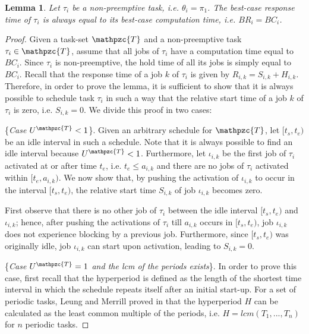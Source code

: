 \documentclass[conference,compsoc]{IEEEtran}
\newtheorem{lemma}{Lemma}
\begin{document}
\begin{lemma}
	\textit{Let $\tau_i$ be a non-preemptive task, i.e. $\theta_i = \pi_1$. The \textit{best-case response time} of $\tau_i$ is always equal to its \textit{best-case computation time}, i.e. $BR_i = BC_i$.}
\end{lemma}

\begin{proof}
	Given a task-set $\mathpzc{T}$ and a non-preemptive task $\tau_i \in \mathpzc{T}$, assume that all jobs of $\tau_i$ have a computation time equal to $BC_i$. Since $\tau_i$ is non-preemptive, the hold time of all its jobs is simply equal to $BC_i$. Recall that the response time of a job $k$ of $\tau_i$ is given by $R_{i,k}=S_{i,k}+H_{i,k}$. Therefore, in order to prove the lemma, it is sufficient to show that it is always possible to schedule task $\tau_i$ in such a way that the relative start time of a job $k$ of $\tau_i$ is zero, i.e. $S_{i,k}=0$. We divide this proof in two cases:
	
	\{\textit{Case $U^{\mathpzc{T}} < 1$}\}. Given an arbitrary schedule for $\mathpzc{T}$, let $[t_s,t_e)$ be an idle interval in such a schedule. Note that it is always possible to find an idle interval because $U^{\mathpzc{T}} < 1$. Furthermore, let $\iota_{i,k}$  be the first job of $\tau_i$ activated at or after time $t_e$, i.e. $t_e \leq a_{i,k}$ and there are no jobs of $\tau_i$ activated within $[t_e, a_{i,k})$. We now show that, by pushing the activation of $\iota_{i,k}$ to occur in the interval $[t_s,t_e)$, the relative start time $S_{i,k}$ of job $\iota_{i,k}$ becomes zero.
	
	First observe that there is no other job of $\tau_i$ between the idle interval $[t_s,t_e)$ and $\iota_{i,k}$; hence, after pushing the activations of $\tau_i$ till $a_{i,k}$ occurs in $[t_s,t_e)$, job $\iota_{i,k}$ does not experience blocking by a previous job. Furthermore, since $[t_s,t_e)$ was originally idle, job $\iota_{i,k}$ can start upon activation, leading to $S_{i,k} = 0$.
	
	\{\textit{Case $U^{\mathpzc{T}} = 1$ and the lcm of the periods exists}\}. 
	In order to prove this case, first recall that the hyperperiod is defined as the length of the shortest time interval in which the schedule repeats itself after an initial start-up. For a set of periodic tasks, Leung and Merrill proved in \cite{LM80} that the hyperperiod $H$ can be calculated as the least common multiple of the periods, i.e. $H=lcm(T_1,...,T_n)$ for $n$ periodic tasks.
	

\end{proof}
\end{document}
